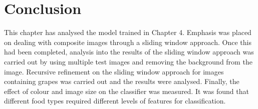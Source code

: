 \section{Conclusion}
This chapter has analysed the model trained in Chapter 4.
Emphasis was placed on dealing with composite images through a sliding window approach.
Once this had been completed, analysis into the results of the sliding window approach was carried out by using multiple test images and removing the background from the image.
Recursive refinement on the sliding window approach for images containing grapes was carried out and the results were analysed.
Finally, the effect of colour and image size on the classifier was measured.
It was found that different food types required different levels of features for classification.
% 

